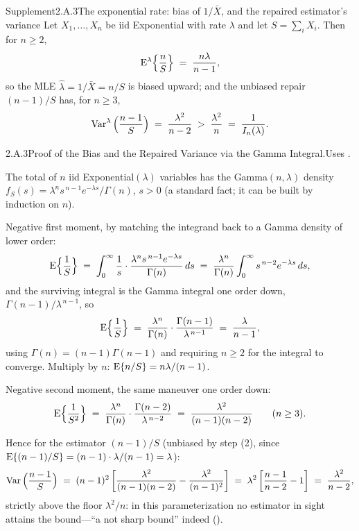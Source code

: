 \documentclass[main.tex]{subfiles}
\begin{document}
\begin{ObjL}{Supplement}{2.A.3}{The exponential rate: bias of $1/\bar X$, and the repaired estimator's variance}
Let $X_1,\dots,X_n$ be iid Exponential with rate $\lambda$ and let $S=\sum_i X_i$. Then for
$n\ge2$,
\[ \mathrm{E}^{\lambda}\Big\{\frac{n}{S}\Big\} \;=\; \frac{n\lambda}{n-1} , \]
so the MLE $\hat\lambda=1/\bar X=n/S$ is biased upward; and the unbiased repair
$(n-1)/S$ has, for $n\ge3$,
\[ \operatorname{Var}^{\lambda}\Big(\frac{n-1}{S}\Big) \;=\; \frac{\lambda^2}{n-2}
   \;>\; \frac{\lambda^2}{n} \;=\; \frac{1}{I_n(\lambda)} . \]
\end{ObjL}
\begin{Prf}{2.A.3}{Proof of the Bias and the Repaired Variance via the Gamma Integral.}{Uses .}
\item The total of $n$ iid Exponential$(\lambda)$ variables has the Gamma$(n,\lambda)$
      density $f_S(s)=\lambda^n s^{\,n-1} e^{-\lambda s}/\Gamma(n)$, $s>0$ (a standard
      fact; it can be built by induction on $n$).
\item Negative first moment, by matching the integrand back to a Gamma density of lower
      order:
      \[ \mathrm{E}\Big\{\frac1S\Big\}
         \;=\; \int_0^{\infty} \frac1s\cdot\frac{\lambda^n s^{\,n-1}e^{-\lambda s}}
         {\Gamma(n)}\,ds
         \;=\; \frac{\lambda^n}{\Gamma(n)} \int_0^{\infty} s^{\,n-2}e^{-\lambda s}\,ds , \]
      and the surviving integral is the Gamma integral one order down,
      $\Gamma(n-1)/\lambda^{\,n-1}$, so
      \[ \mathrm{E}\Big\{\frac1S\Big\}
         \;=\; \frac{\lambda^n}{\Gamma(n)}\cdot\frac{\Gamma(n-1)}{\lambda^{\,n-1}}
         \;=\; \frac{\lambda}{n-1} , \]
      using $\Gamma(n)=(n-1)\Gamma(n-1)$ and requiring $n\ge2$ for the integral to
      converge. Multiply by $n$: $\mathrm{E}\{n/S\}=n\lambda/(n-1)$.
\item Negative second moment, the same maneuver one order down:
      \[ \mathrm{E}\Big\{\frac{1}{S^2}\Big\}
         \;=\; \frac{\lambda^n}{\Gamma(n)}\cdot\frac{\Gamma(n-2)}{\lambda^{\,n-2}}
         \;=\; \frac{\lambda^2}{(n-1)(n-2)} \qquad (n\ge3) . \]
\item Hence for the estimator $(n-1)/S$ (unbiased by step (2), since
      $\mathrm{E}\{(n-1)/S\}=(n-1)\cdot\lambda/(n-1)=\lambda$):
      \[ \operatorname{Var}\Big(\frac{n-1}{S}\Big)
         \;=\; (n-1)^2\left[ \frac{\lambda^2}{(n-1)(n-2)}
         - \frac{\lambda^2}{(n-1)^2} \right]
         \;=\; \lambda^2\left[ \frac{n-1}{n-2} - 1 \right]
         \;=\; \frac{\lambda^2}{n-2} , \]
      strictly above the floor $\lambda^2/n$: in this parameterization no estimator in
      sight attains the bound---``a not sharp bound'' indeed ().
\end{Prf}
\end{document}
